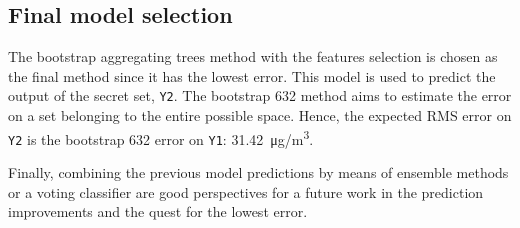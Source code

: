 \documentclass[journal,11pt]{IEEEtran}
\begin{document}
\subsection{Final model selection}

The bootstrap aggregating trees method with the features selection is chosen as the final method since it has the lowest error. This model is used to predict the output of the secret set, \texttt{Y2}. The bootstrap 632 method aims to estimate the error on a set belonging to the entire possible space. Hence, the expected RMS error on \texttt{Y2} is the bootstrap 632 error on \texttt{Y1}: \SI{31.42}{\micro g/m^3}.

Finally, combining the previous model predictions by means of ensemble methods or a voting classifier are good perspectives for a future work in the prediction improvements and the quest for the lowest error.

\printbibliography
\end{document}
